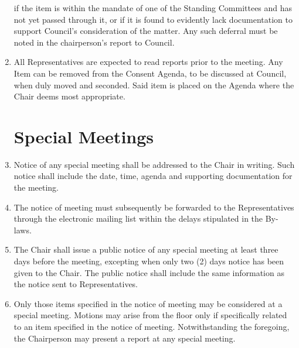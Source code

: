 \documentclass[oneside]{book}
\begin{document}
\begin{enumerate}
if the item is within the mandate of one of the Standing Committees and has not yet passed 
through it, or if it is found to evidently lack documentation to support Council’s 
consideration of the matter. Any such deferral must be noted in the chairperson's report to Council. 
\item \label{remove-from-consent} All Representatives are expected to read reports prior to the meeting.
Any Item can be removed from the Consent Agenda, to be discussed at Council, 
when duly moved and seconded. Said item is placed on the Agenda where the Chair 
deems most appropriate. 

\section{\label{Special_Meetings}Special Meetings }
\item Notice of any special meeting shall be addressed to the Chair in writing.
Such notice shall include the date, time, agenda and supporting documentation for the meeting. 
\item The notice of meeting must subsequently be forwarded to the Representatives through the 
electronic mailing list within the delays stipulated in the By-laws. 
\item The Chair shall issue a public notice of any special meeting at
least three days before the meeting, excepting when only two (2) days notice has been given to the Chair. 
The public notice shall include the same information as the notice sent to Representatives. 
\item Only those items specified in the notice of meeting may be considered
at a special meeting. Motions may arise from the floor only if specifically
related to an item specified in the notice of meeting. Notwithstanding
the foregoing, the Chairperson may present a report at any special
meeting. 


\end{enumerate}
\end{document}
